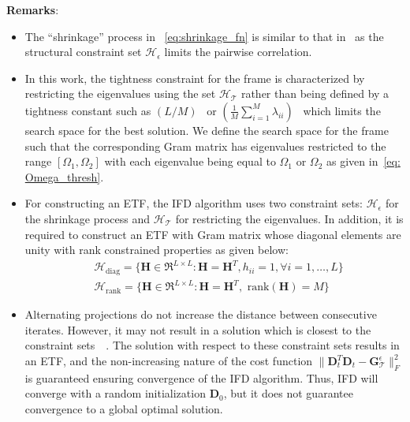 \noindent\textbf{Remarks}: 
%
\begin{itemize}
%
\item The ``shrinkage'' process in ~\eqref{eq:shrinkage_fn} is similar to that in~\cite{Elad} as the structural constraint set $\bm{\mathcal{H}}_{\epsilon}$ limits the pairwise correlation.
%
\item In this work, the tightness constraint for the frame is characterized by restricting the eigenvalues using the set $\bm{\mathcal{H}}_{\bm{\mathcal{T}}}$ rather than being defined by a tightness constant such as $(L/M)$~\cite{Frame, Eva_frame} or $\left(\frac{1}{M}\sum_{i=1}^{M}\lambda_{ii}\right)$~\cite{SRE_Huang} which limits the search space for the best solution. We define the search space for the frame such that the corresponding Gram matrix has eigenvalues restricted to the range $[\Omega_1,\Omega_2]$ with each eigenvalue being equal to $\Omega_1$ or $\Omega_2$ as given in~\eqref{eq: Omega_thresh}.
%
\item For constructing an ETF, the IFD algorithm uses two constraint sets: $\bm{\mathcal{H}}_{\epsilon}$ for the shrinkage process and $\bm{\mathcal{H}}_{\bm{\mathcal{T}}}$ for restricting the eigenvalues. In addition, it is required to construct an ETF with Gram matrix whose diagonal elements are unity with rank constrained properties as given below:
%
\begin{equation*}
    \label{eq: two_sets}
    \begin{split}
    & \bm{\mathcal{H}}_{\text{diag}} = \{\bm{H} \in \Re^{L \times L}: \bm{H}=\bm{H}^{T}, h_{ii}=1, \forall i=1,\dots,L\}\\
    & \bm{\mathcal{H}}_{\text{rank}} = \{\bm{H} \in \Re^{L \times L}: \bm{H}=\bm{H}^{T}, \text{ rank}(\bm{H})=M \}
    \end{split}
\end{equation*}
%
\item Alternating projections do not increase the distance between consecutive iterates. However, it may not result in a solution which is closest to the constraint sets~\cite{Frame}~\cite{Lewis_convergence}. The solution with respect to these constraint sets results in an ETF, and the non-increasing nature of the cost function $\|\bm{D}_{t}^{T}\bm{D}_{t} - \bm{G}^{\epsilon}_{\bm{\mathcal{T}}}\|_{F}^{2}$ is guaranteed ensuring convergence of the IFD algorithm. Thus, IFD will converge with a random initialization $\bm{D}_{0}$, but it does not guarantee convergence to a global optimal solution.

\end{itemize}
